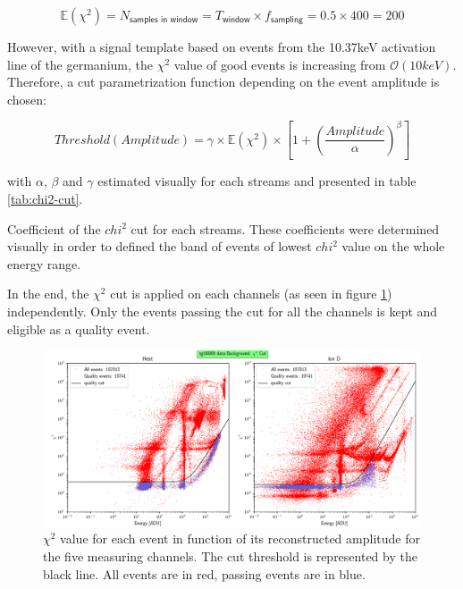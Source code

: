 \begin{equation}
\mathbb{E}\left( \chi^2 \right) 
= N_{\textsf{samples in window}}
 = T_{\textsf{window}} \times f_{\textsf{sampling}}
 = 0.5 \times 400 = 200
\end{equation}

However, with a signal template based on events from the 10.37keV activation line of the germanium, the $\chi^2$ value of good events is increasing from $\mathcal{O}(10keV)$.
Therefore, a cut parametrization function depending on the event amplitude is chosen:

\begin{equation}
Threshold(Amplitude) 
= \gamma \times \mathbb{E}\left( \chi^2 \right)  \times \left[ 1+ \left( \frac{Amplitude}{\alpha} \right)^\beta \right]
\end{equation}

with $\alpha$, $\beta$ and $\gamma$ estimated visually for each streams and presented in table \ref{tab:chi2-cut}.

\begin{table}[]
\centering

\caption{Coefficient of the $chi^2$ cut for each streams. These coefficients were determined visually in order to defined the band of events of lowest $chi^2$ value on the whole energy range.}
\label{tab:chi2-cut}
\end{table}


In the end, the $\chi^2$ cut is applied on each channels (as seen in figure \ref{fig:chi2-cut}) independently. Only the events passing the cut for all the channels is kept and eligible as a quality event.

\begin{figure}
\centering
\includegraphics[width=\linewidth,]{Figures/Neutron/chi2_cut.png}
\caption{$\chi^2$ value for each event in function of its reconstructed amplitude for the five measuring channels. The cut threshold is represented by the black line. All events are in red, passing events are in blue.}
\label{fig:chi2-cut}
\end{figure}

